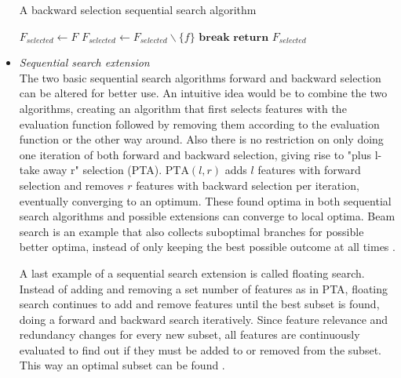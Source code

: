 \documentclass[10pt,a4paper]{report}
\begin{document}
\begin{itemize}
		\begin{algorithm}[H]
			\caption{A backward selection sequential search algorithm \cite{Reunanen2006}}\label{alg:BackwardSelection}
			\begin{algorithmic}[1]
				\State $F_{\textit{selected}} \gets F$				
						
				 
				\State $F_{\textit{selected}} \gets F_{\textit{selected}} \backslash \{f\}$ 
				\EndIf
				 
				\State $\textbf{break}$
				\EndIf
				\EndFor
				\State $\textbf{return } F_{\textit{selected}}$
				\EndProcedure
			\end{algorithmic}
		\end{algorithm}
		
		\item \textit{Sequential search extension} \\
		The two basic sequential search algorithms forward and backward selection can be altered for better use. An intuitive idea would be to combine the two algorithms, creating an algorithm that first selects features with the evaluation function followed by removing them according to the evaluation function or the other way around. Also there is no restriction on only doing one iteration of both forward and backward selection, giving rise to "plus l-take away r" selection (PTA). $\text{PTA}(l, r)$ adds $l$ features with forward selection and removes $r$ features with backward selection per iteration, eventually converging to an optimum. 
		These found optima in both sequential search algorithms and possible extensions can converge to local optima. Beam search is an example that also collects suboptimal branches for possible better optima, instead of only keeping the best possible outcome at all times \cite{Reunanen2006}.
		
		A last example of a sequential search extension is called floating search. Instead of adding and removing a set number of features as in PTA, floating search continues to add and remove features until the best subset is found, doing a forward and backward search iteratively. Since feature relevance and redundancy changes for every new subset, all features are continuously evaluated to find out if they must be added to or removed from the subset. This way an optimal subset can be found \cite{Reunanen2006}.
	\end{itemize}
	
\end{document}
